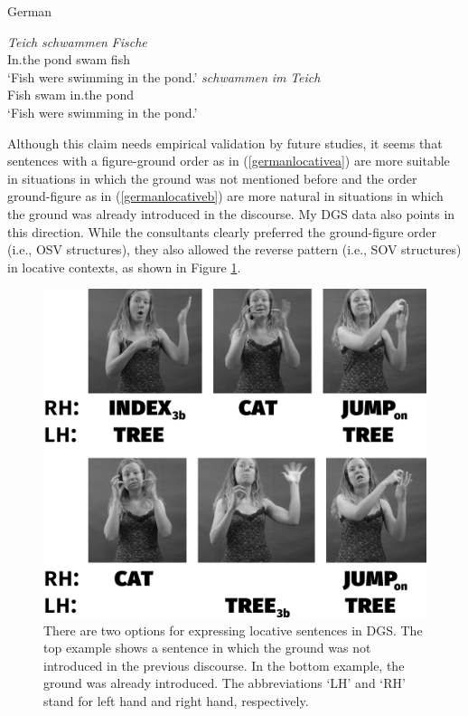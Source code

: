\begin{exe}
\ex German \label{germanlocative}\begin{xlist} 
\ex {} {\textit{Teich}} {\textit{schwammen}} {\textit{Fische}}\\
{In.the} {pond} {swam} {fish}  \\
\trans `Fish were swimming in the pond.' \label{germanlocativea}
\ex {} {\textit{schwammen}} {\textit{im}} {\textit{Teich}}  \\
{Fish} {swam} {in.the} {pond} \\
\trans `Fish were swimming in the pond.' \label{germanlocativeb}

\end{xlist}
\end{exe} 




\noindent Although this claim needs empirical validation by future studies, it seems that sentences with a figure-ground order as in (\ref{germanlocativea}) are more suitable in situations in which the ground was not mentioned before and the order ground-figure as in  (\ref{germanlocativeb}) are more natural in situations in which the ground was already introduced in the discourse. My DGS data also points in this direction. While the consultants clearly preferred the ground-figure order (i.e., OSV structures), they also allowed the reverse pattern (i.e., SOV structures) in locative contexts, as shown in  Figure \ref{fig:figuregroundcat}.

\begin{figure}[b]
\centering
	\includegraphics[width=.72\textwidth]{figuregroundcatsw.jpg}
	\caption{There are two options for expressing locative sentences in DGS. The top example shows a sentence in which the ground was not introduced in the previous discourse. In the bottom example, the ground was already introduced. The abbreviations `LH' and `RH' stand for left hand and right hand, respectively.}
	\label{fig:figuregroundcat}
\end{figure}


